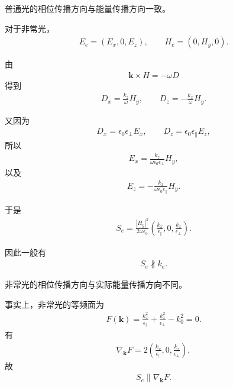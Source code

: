\documentclass{article}
\begin{document}
普通光的相位传播方向与能量传播方向一致。

对于非常光，
\begin{align}
    E_e=(E_x,0,E_z),
    \qquad
    H_e=(0,H_y,0).
\end{align}

由
\begin{align}
    \mathbf k\times H=-\omega D
\end{align}
得到
\begin{align}
    D_x
    =
    \frac{k_z}{\omega}H_y,
    \qquad
    D_z
    =
    -\frac{k_x}{\omega}H_y.
\end{align}

又因为
\begin{align}
    D_x
    =
    \epsilon_0\epsilon_\perp E_x,
    \qquad
    D_z
    =
    \epsilon_0\epsilon_\parallel E_z,
\end{align}
所以
\begin{align}
    E_x
    =
    \frac{k_z}
    {\omega\epsilon_0\epsilon_\perp}H_y,
\end{align}
以及
\begin{align}
    E_z
    =
    -\frac{k_x}
    {\omega\epsilon_0\epsilon_\parallel}H_y.
\end{align}

于是
\begin{align}
    \boxed{
    S_e
    =
    \frac{|H_y|^2}
    {2\omega\epsilon_0}
    \left(
    \frac{k_x}{\epsilon_\parallel},
    0,
    \frac{k_z}{\epsilon_\perp}
    \right)
    }.
\end{align}

因此一般有
\begin{align}
    \boxed{
    S_e\not\parallel k_e
    }.
\end{align}

非常光的相位传播方向与实际能量传播方向不同。

事实上，非常光的等频面为
\begin{align}
    F(\mathbf k)
    =
    \frac{k_x^2}{\epsilon_\parallel}
    +
    \frac{k_z^2}{\epsilon_\perp}
    -
    k_0^2
    =0.
\end{align}
有
\begin{align}
    \nabla_{\mathbf k}F
    =
    2
    \left(
    \frac{k_x}{\epsilon_\parallel},
    0,
    \frac{k_z}{\epsilon_\perp}
    \right),
\end{align}
故
\begin{align}
    \boxed{
    S_e\parallel\nabla_{\mathbf k}F
    }.
\end{align}
\end{document}
